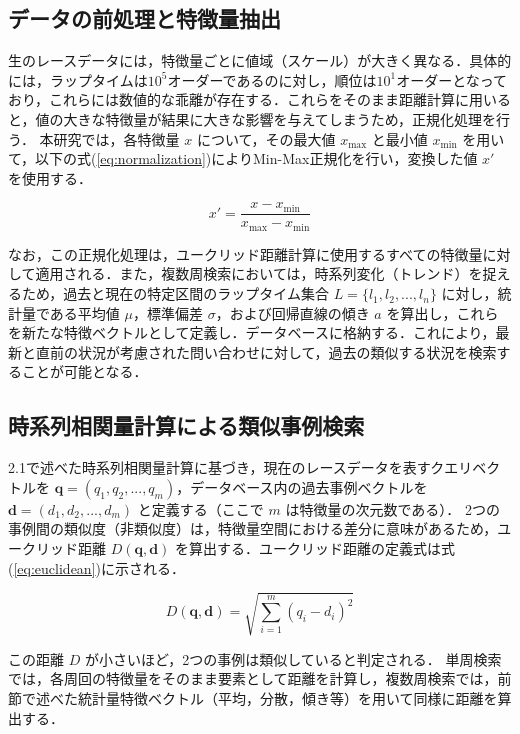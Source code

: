 \documentclass{deimj}
\begin{document}
\subsection{データの前処理と特徴量抽出}

生のレースデータには，特徴量ごとに値域（スケール）が大きく異なる．具体的には，ラップタイムは$10^5$オーダーであるのに対し，順位は$10^1$オーダーとなっており，これらには数値的な乖離が存在する．これらをそのまま距離計算に用いると，値の大きな特徴量が結果に大きな影響を与えてしまうため，正規化処理を行う．
本研究では，各特徴量 $x$ について，その最大値 $x_{\max}$ と最小値 $x_{\min}$ を用いて，以下の式(\ref{eq:normalization})によりMin-Max正規化を行い，変換した値 $x'$ を使用する．

\begin{equation}
  x' = \frac{x - x_{\min}}{x_{\max} - x_{\min}}
  \label{eq:normalization}
\end{equation}

なお，この正規化処理は，ユークリッド距離計算に使用するすべての特徴量に対して適用される．また，複数周検索においては，時系列変化（トレンド）を捉えるため，過去と現在の特定区間のラップタイム集合 $L = \{l_1, l_2, ..., l_n\}$ に対し，統計量である平均値 $\mu$，標準偏差 $\sigma$，および回帰直線の傾き $a$ を算出し，これらを新たな特徴ベクトルとして定義し．データベースに格納する．これにより，最新と直前の状況が考慮された問い合わせに対して，過去の類似する状況を検索することが可能となる．

\subsection{時系列相関量計算による類似事例検索}

2.1で述べた時系列相関量計算に基づき，現在のレースデータを表すクエリベクトルを $\mathbf{q} = (q_1, \allowbreak q_2, \allowbreak ..., \allowbreak q_m)$，データベース内の過去事例ベクトルを $\mathbf{d} = (d_1, d_2, ..., d_m)$ と定義する（ここで $m$ は特徴量の次元数である）．
2つの事例間の類似度（非類似度）は，特徴量空間における差分に意味があるため，ユークリッド距離 $D(\mathbf{q}, \mathbf{d})$ を算出する．ユークリッド距離の定義式は式(\ref{eq:euclidean})に示される．

\begin{equation}
  D(\mathbf{q}, \mathbf{d}) = \sqrt{\sum_{i=1}^{m} (q_i - d_i)^2}
  \label{eq:euclidean}
\end{equation}

この距離 $D$ が小さいほど，2つの事例は類似していると判定される．
単周検索では，各周回の特徴量をそのまま要素として距離を計算し，複数周検索では，前節で述べた統計量特徴ベクトル（平均，分散，傾き等）を用いて同様に距離を算出する．
\end{document}
